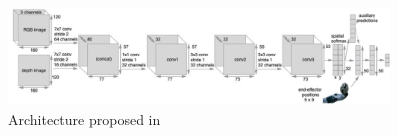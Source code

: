\begin{figure}[bt]
    \centering
    \includegraphics[width=0.9\textwidth]{figures/images/deep_imitation_bc/deep_imitation_bc.jpg}
    \caption{Architecture proposed in~\cite{zhang2018deep_vr_teleoperation}}
    \label{fig:deep_bc}
\end{figure}
